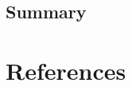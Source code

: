\documentclass[english,,man]{apa6}
\theoremstyle{definition}
\theoremstyle{definition}
\theoremstyle{definition}
\theoremstyle{remark}
\begin{document}
\hypertarget{summary-2}{%
\subsection{Summary}\label{summary-2}}

\newpage

\hypertarget{references}{%
\section{References}\label{references}}

\setlength{\parindent}{-0.5in}
\setlength{\leftskip}{0.5in}
\end{document}
